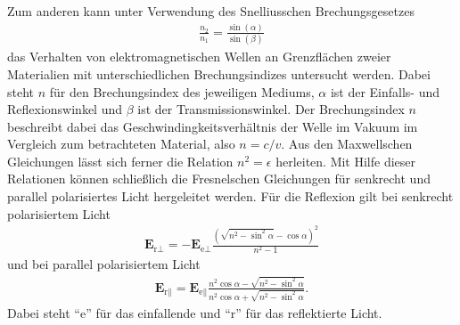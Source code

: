 \noindent
Zum anderen kann unter Verwendung des Snelliusschen Brechungsgesetzes
\begin{align}
    \frac{n_2}{n_1} = \frac{\sin(\alpha)}{\sin(\beta)}
    \label{eq:snellius}
\end{align}
das Verhalten von elektromagnetischen Wellen an Grenzflächen zweier Materialien mit unterschiedlichen Brechungsindizes untersucht werden.
Dabei steht $n$ für den Brechungsindex des jeweiligen Mediums, $\alpha$ ist der Einfalls- und Reflexionswinkel und $\beta$ ist der Transmissionswinkel.
Der Brechungsindex $n$ beschreibt dabei das Geschwindingkeitsverhältnis der Welle im Vakuum im Vergleich zum betrachteten Material, also $n = c/v$.
Aus den Maxwellschen Gleichungen lässt sich ferner die Relation $n^2 = \epsilon$ herleiten.
Mit Hilfe dieser Relationen können schließlich die Fresnelschen Gleichungen für senkrecht und parallel polarisiertes Licht hergeleitet werden.
Für die Reflexion gilt bei senkrecht polarisiertem Licht
\begin{align}
    \symbf{E}_{\text{r}\perp} = - \symbf{E}_{\text{e}\perp} \frac{\left(\sqrt{n^2 -\sin^2\alpha} - \cos{\alpha}\right)^2}{n^2 - 1}
    \label{eq:senkrecht}
\end{align}
und bei parallel polarisiertem Licht
\begin{align}
    \symbf{E}_{\text{r}\parallel} = \symbf{E}_{\text{e}\parallel} \frac{n^2 \cos\alpha - \sqrt{n^2 - \sin^2\alpha}}{n^2 \cos\alpha + \sqrt{n^2 - \sin^2\alpha}}.
    \label{eq:parallel}
\end{align}
Dabei steht \enquote{e} für das einfallende und \enquote{r} für das reflektierte Licht.

